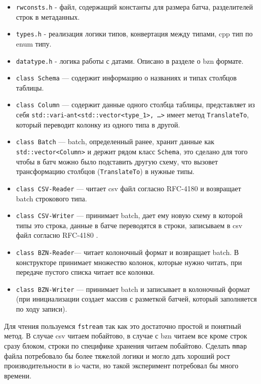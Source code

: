 \documentclass[a4paper,12pt]{extarticle}
\begin{document}
\begin{itemize}
\item \texttt{rwconsts.h} - файл, содержащий константы для размера батча, разделителей 
строк в метаданных.

\item \texttt{types.h} - реализация логики типов, конвертация между типами,
cpp тип по enum типу.

\item \texttt{datatype.h} - логика работы с датами. Описано в разделе о bzn формате.

\item \texttt{class Schema} — содержит информацию о названиях и типах столбцов таблицы.

\item \texttt{class Column} — содержит данные одного столбца таблицы, представляет из себя
\texttt{std::vari}-\texttt{ant<std::vector<type\_1>, \dots>} имеет метод \texttt{TranslateTo}, который
переводит колонку из одного типа в другой.

\item \texttt{class Batch} — batch, определенный ранее, хранит данные как \texttt{std::vector<Column>} и
держит рядом класс \texttt{Schema}, это сделано для того чтобы в батч можно было подставить
другую схему, что вызовет трансформацию столбцов (\texttt{TranslateTo}) в нужные типы.

\item \texttt{class CSV-Reader} — читает csv файл согласно RFC-4180 \cite{rfc4180} и возвращает
batch строкового типа.

\item \texttt{class CSV-Writer} — принимает batch, дает ему новую схему в которой типы это строка,
данные в батче переводятся в строки, записываем в csv файл согласно
RFC-4180 \cite{rfc4180}.

\item \texttt{class BZN-Reader}— читает колоночный формат и возвращает batch.
В конструкторе принимает множество колонок, которые нужно читать, при передаче
пустого списка читает все колонки.

\item \texttt{class BZN-Writer} — принимает batch и записывает в колоночный формат (при
инициализации создает массив с разметкой батчей, который заполняется по ходу записи).

\end{itemize}
Для чтения пользуемся \texttt{fstream} так как это достаточно простой и понятный метод.
В случае csv читаем побайтово, в случае с bzn читаем все кроме строк сразу блоком,
строки по специфике хранения читаем побайтово. Сделать \texttt{mmap} файла потребовало бы 
более тяжелой логики и могло дать хороший рост производительности в io части,
но такой эксперимент потребовал бы много времени.
\end{document}
